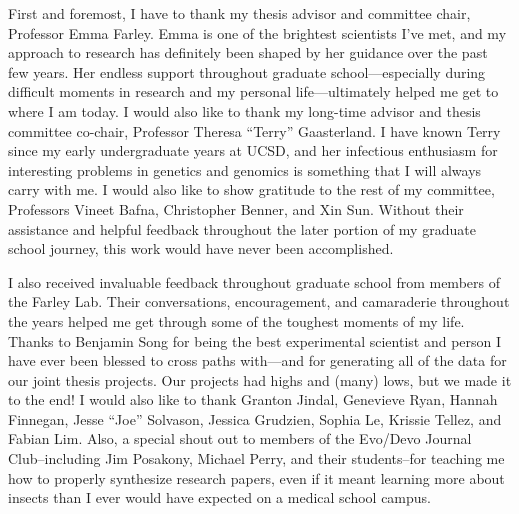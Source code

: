 \documentclass[11pt]{formatting-template}
\begin{document}
\tableofcontents
\listoffigures
\listoftables

\begin{acknowledgements}
	First and foremost, I have to thank my thesis advisor and committee chair, Professor Emma Farley. Emma is one of the brightest scientists I’ve met, and my approach to research has definitely been shaped by her guidance over the past few years. Her endless support throughout graduate school—especially during difficult moments in research and my personal life—ultimately helped me get to where I am today. I would also like to thank my long-time advisor and thesis committee co-chair, Professor Theresa “Terry” Gaasterland. I have known Terry since my early undergraduate years at UCSD, and her infectious enthusiasm for interesting problems in genetics and genomics is something that I will always carry with me. I would also like to show gratitude to the rest of my committee, Professors Vineet Bafna, Christopher Benner, and Xin Sun. Without their assistance and helpful feedback throughout the later portion of my graduate school journey, this work would have never been accomplished. 
	
	I also received invaluable feedback throughout graduate school from members of the Farley Lab. Their conversations, encouragement, and camaraderie throughout the years helped me get through some of the toughest moments of my life. Thanks to Benjamin Song for being the best experimental scientist and person I have ever been blessed to cross paths with—and for generating all of the data for our joint thesis projects. Our projects had highs and (many) lows, but we made it to the end! I would also like to thank Granton Jindal, Genevieve Ryan, Hannah Finnegan, Jesse “Joe” Solvason, Jessica Grudzien, Sophia Le, Krissie Tellez, and Fabian Lim. Also, a special shout out to members of the Evo/Devo Journal Club–including Jim Posakony, Michael Perry, and their students–for teaching me how to properly synthesize research papers, even if it meant learning more about insects than I ever would have expected on a medical school campus.
	

\end{acknowledgements}
\end{document}
